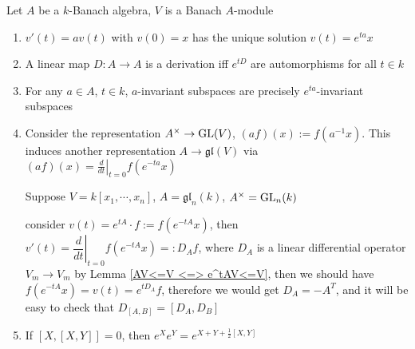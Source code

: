 \documentclass[main]{subfiles}
\begin{document}
\begin{proposition}
Let $A$ be a $k$-Banach algebra, $V$ is a Banach $A$-module
\begin{enumerate}
\item $v'(t)=av(t)$ with $v(0)=x$ has the unique solution $v(t)=e^{ta}x$
\item A linear map $D:A\to A$ is a derivation iff $e^{tD}$ are automorphisms for all $t\in k$
\item For any $a\in A$, $t\in k$, $a$-invariant subspaces are precisely $e^{ta}$-invariant subspaces
\item Consider the representation $A^\times\to\operatorname{GL}(V)$, $(af)(x):=f(a^{-1}x)$. This induces another representation $A\to\mathfrak{gl}(V)$ via $(af)(x)=\left.\frac{d}{dt}\right|_{t=0}f(e^{-ta}x)$

Suppose $V=k[x_1,\cdots,x_n]$, $A=\mathfrak{gl}_n(k)$, $A^\times=\operatorname{GL}_n(k)$

consider $v(t)=e^{tA}\cdot f:=f(e^{-tA}x)$, then $v'(t)=\left.\dfrac{d}{dt}\right|_{t=0}f(e^{-tA}x)=:D_Af$, where $D_A$ is a linear differential operator $V_m\to V_m$ by Lemma \ref{AV<=V <=> e^tAV<=V}, then we should have $f(e^{-tA}x)=v(t)=e^{tD_A}f$, therefore we would get $D_A=-A^T$, and it will be easy to check that $D_{[A,B]}=[D_A,D_B]$
\item If $[X,[X,Y]]=0$, then $e^Xe^Y=e^{X+Y+\frac{1}{2}[X,Y]}$
\end{enumerate}
\end{proposition}
\end{document}
